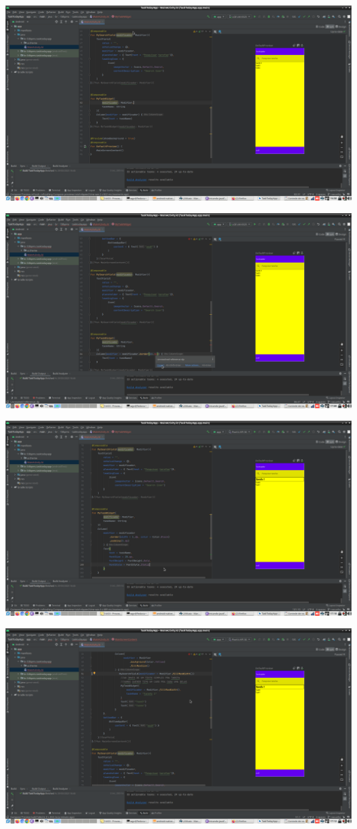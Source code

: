 \documentclass[11pt]{article}
\begin{document}
\begin{center}
\includegraphics[width=.9\linewidth]{./Captura de tela de 2023-03-29 16-58-35.png}
\end{center}
\begin{center}
\includegraphics[width=.9\linewidth]{./Captura de tela de 2023-03-29 17-00-36.png}
\end{center}
\begin{center}
\includegraphics[width=.9\linewidth]{./Captura de tela de 2023-03-29 17-10-57.png}
\end{center}
\begin{center}
\includegraphics[width=.9\linewidth]{./Captura de tela de 2023-03-29 17-12-10.png}
\end{center}
\end{document}
